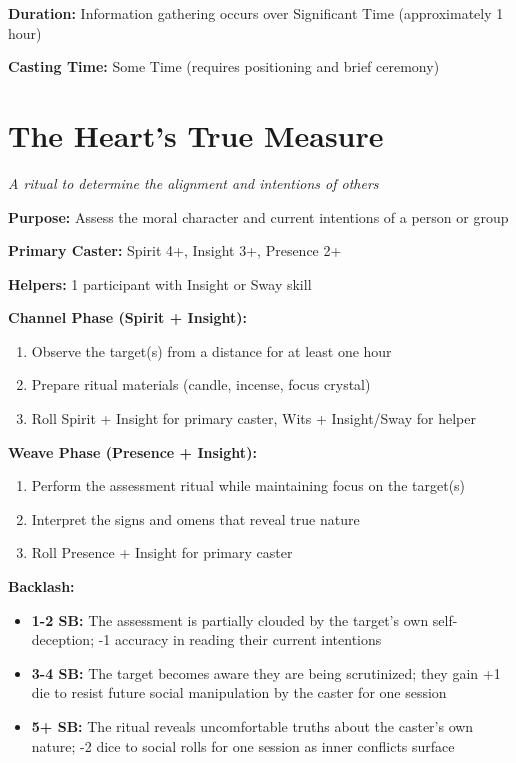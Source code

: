 \textbf{Duration:} Information gathering occurs over Significant Time (approximately 1 hour)

\textbf{Casting Time:} Some Time (requires positioning and brief ceremony)

\section*{The Heart's True Measure}
\textit{A ritual to determine the alignment and intentions of others}

\textbf{Purpose:} Assess the moral character and current intentions of a person or group

\textbf{Primary Caster:} Spirit 4+, Insight 3+, Presence 2+

\textbf{Helpers:} 1 participant with Insight or Sway skill

\textbf{Channel Phase (Spirit + Insight):}
\begin{enumerate}
\item Observe the target(s) from a distance for at least one hour
\item Prepare ritual materials (candle, incense, focus crystal)
\item Roll Spirit + Insight for primary caster, Wits + Insight/Sway for helper
\end{enumerate}

\textbf{Weave Phase (Presence + Insight):}
\begin{enumerate}
\item Perform the assessment ritual while maintaining focus on the target(s)
\item Interpret the signs and omens that reveal true nature
\item Roll Presence + Insight for primary caster
\end{enumerate}

\textbf{Backlash:}
\begin{itemize}
\item \textbf{1-2 SB:} The assessment is partially clouded by the target's own self-deception; -1 accuracy in reading their current intentions
\item \textbf{3-4 SB:} The target becomes aware they are being scrutinized; they gain +1 die to resist future social manipulation by the caster for one session
\item \textbf{5+ SB:} The ritual reveals uncomfortable truths about the caster's own nature; -2 dice to social rolls for one session as inner conflicts surface
\end{itemize}


